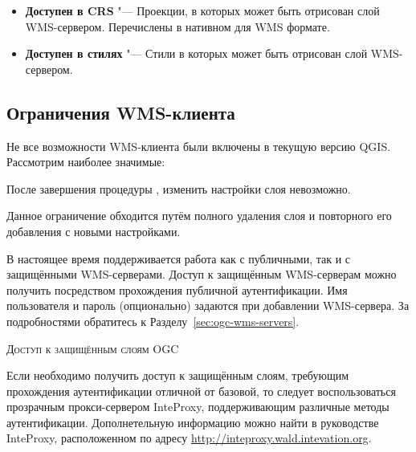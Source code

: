 \begin{itemize}[label=--]
\begin{itemize}[label=--]
\item \textbf{Доступен в CRS}      "--- Проекции, в которых может быть отрисован
                                       слой WMS-сервером. Перечислены в нативном
                                       для WMS формате.

\item \textbf{Доступен в стилях}   "--- Стили в которых может быть отрисован слой
                                       WMS-сервером.

\end{itemize}

\end{itemize}


\subsection{Ограничения WMS-клиента}\label{sec:ogc-wms-limits}

Не все возможности WMS-клиента были включены в текущую версию
QGIS. Рассмотрим наиболее значимые:


После завершения процедуры ,
изменить настройки слоя невозможно.

Данное ограничение обходится путём полного удаления слоя и повторного
его добавления с новыми настройками.


В настоящее время поддерживается работа как с публичными, так и с защищёнными
WMS-серверами. Доступ к защищённым WMS-серверам можно получить посредством
прохождения публичной аутентификации.
Имя пользователя и пароль (опционально) задаются при добавлении WMS-сервера.
За подробностями обратитесь к Разделу~\ref{sec:ogc-wms-servers}.

\begin{Tip}[ht]\caption{\textsc{Доступ к защищённым слоям OGC}}
Если необходимо получить доступ к защищённым слоям, требующим прохождения
аутентификации отличной от базовой, то следует воспользоваться прозрачным
прокси-сервером InteProxy, поддерживающим различные методы
аутентификации. Дополнетельную информацию можно найти в руководстве
InteProxy, расположенном по адресу
\url{http://inteproxy.wald.intevation.org}.
\end{Tip}

